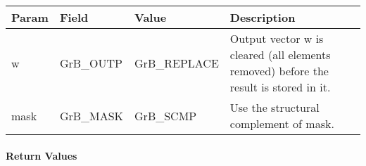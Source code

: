 \begin{itemize}[leftmargin=1in]
    \begin{tabular}{lllp{2.5in}}
        Param & Field  & Value & Description \\
        \hline
        {\sf w}    & {\sf GrB\_OUTP} & {\sf GrB\_REPLACE} & Output vector {\sf w}
        is cleared (all elements removed) before the result is stored in it. \\
        
        {\sf mask} & {\sf GrB\_MASK} & {\sf GrB\_SCMP}   & Use the structural 
        complement of {\sf mask}. \\
    \end{tabular}
\end{itemize}

\paragraph{Return Values}

